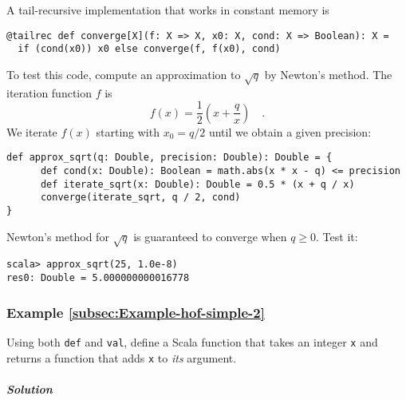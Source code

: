 A tail-recursive implementation that works in constant memory is 
\begin{lstlisting}
@tailrec def converge[X](f: X => X, x0: X, cond: X => Boolean): X =
  if (cond(x0)) x0 else converge(f, f(x0), cond)
\end{lstlisting}
To test this code, compute an approximation to $\sqrt{q}$ by Newton\textsf{'}s
method. The iteration function $f$ is 
\[
f(x)=\frac{1}{2}\left(x+\frac{q}{x}\right)\quad.
\]
We iterate $f(x)$ starting with $x_{0}=q/2$ until we obtain a given
precision:
\begin{lstlisting}
def approx_sqrt(q: Double, precision: Double): Double = {
      def cond(x: Double): Boolean = math.abs(x * x - q) <= precision
      def iterate_sqrt(x: Double): Double = 0.5 * (x + q / x)
      converge(iterate_sqrt, q / 2, cond)
}
\end{lstlisting}
Newton\textsf{'}s method for $\sqrt{q}$ is guaranteed to converge when $q\geq0$.
Test it:
\begin{lstlisting}
scala> approx_sqrt(25, 1.0e-8)
res0: Double = 5.000000000016778
\end{lstlisting}


\subsubsection{Example \label{subsec:Example-hof-simple-2}\ref{subsec:Example-hof-simple-2}}

Using both \lstinline!def! and \lstinline!val!, define a Scala function
that takes an integer \lstinline!x! and returns a function that adds
\lstinline!x! to \emph{its} argument.

\subparagraph{Solution}

